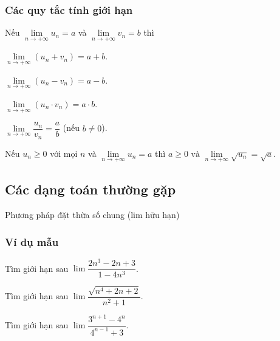 	\subsubsection{Các quy tắc tính giới hạn}
	\begin{tc} 
		\begin{enumEX}[a)]{1}
			\item Nếu $\lim \limits_{n \rightarrow+\infty} u_{n}=a$ và $\lim \limits_{n \rightarrow+\infty} v_{n}=b$ thì 
			\begin{enumEX}[-)]{2}
				\item 	$\lim \limits_{n \rightarrow+\infty}\left(u_{n}+v_{n}\right)=a+b$.
				\item   $\lim \limits_{n \rightarrow+\infty}\left(u_{n}-v_{n}\right)=a-b$. 
				\item $\lim \limits_{n \rightarrow+\infty}\left(u_{n} \cdot v_{n}\right)=a \cdot b$.
				\item $\lim \limits_{n \rightarrow+\infty} \dfrac{u_{n}}{v_{n}}=\dfrac{a}{b}$ (nếu $b \neq 0$).
			\end{enumEX}
			\item Nếu $u_{n} \geq 0$ với mọi $n$ và $\lim \limits_{n \rightarrow+\infty} u_{n}=a$ thì $
			a \geq 0 \text { và } \lim \limits_{n \rightarrow+\infty} \sqrt{u_{n}}=\sqrt{a}$.
		\end{enumEX}
		
	\end{tc}
\subsection{Các dạng toán thường gặp}
\begin{dang}{Phương pháp đặt thừa số chung (lim hữu hạn)}
	
\end{dang}
\subsubsection{Ví dụ mẫu}
\begin{vd}%
	Tìm giới hạn sau $\lim\dfrac{2n^3-2n+3}{1-4n^3}$.
	\loigiai{
		\[\lim\dfrac{2n^3-2n+3}{1-4n^3}=\lim\dfrac{2-\dfrac{2}{n^2}+\dfrac{3}{n^3}}{\dfrac{1}{n^3}-4}=-\dfrac{1}{2}.\]}
\end{vd}
\begin{vd}%
	Tìm giới hạn sau $\lim\dfrac{\sqrt{n^4+2n+2}}{n^2+1}$.
	\loigiai{
		\[\lim\dfrac{\sqrt{n^4+2n+2}}{n^2+1} = \lim\dfrac{\sqrt{1+\dfrac{2}{n^3}+\dfrac{2}{n^4}}}{1+\dfrac{1}{n^2}}=1.\]}
\end{vd}
\begin{vd}%
	Tìm giới hạn sau $\lim\dfrac{3^{n+1}-4^n}{4^{n-1}+3}$.
	\loigiai{
		\[\lim\dfrac{3^{n+1}-4^n}{4^{n-1}+3} = \lim\dfrac{9\cdot 3^{n-1}-4\cdot 4^{n-1}}{4^{n-1}+3}=\lim\dfrac{9\cdot\left(\dfrac{3}{4}\right)^{n-1}-4}{1+3\cdot\left(\dfrac{1}{4}\right)^{n-1}}=-4.\]}
\end{vd}

